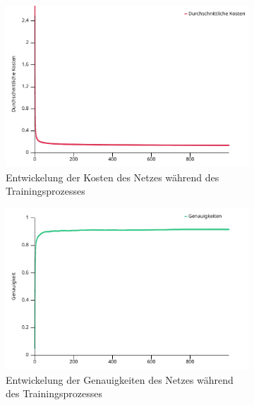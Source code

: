 \begin{figure}[h]
    \centering
    \begin{subfigure}{0.45\textwidth}
        \centering
        \includegraphics[width=\textwidth]{grafiken/kosten_1000}
        \caption{Entwickelung der Kosten des Netzes während des Trainingsprozesses}
        \label{fig:kosten-diagramm}
    \end{subfigure}
    \begin{subfigure}{0.45\textwidth}
        \centering
        \includegraphics[width=\textwidth]{grafiken/genauigkeiten_1000}
        \caption{Entwickelung der Genauigkeiten des Netzes während des Trainingsprozesses}
        \label{fig:genauigkeiten-diagramm}
    \end{subfigure}
    \caption[Entwickelung der Kosten und Genauigkeiten während des Trainings: \textit{Eigene Grafik, erstellt mit plotlib für Rust}]{}
\end{figure}